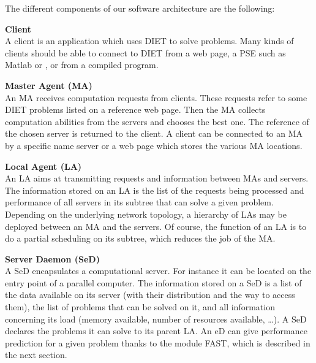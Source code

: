 The different components of our software architecture are the following:      

\begin{description}
\item \textbf{Client}\\
  A client is an application which uses DIET to solve problems.  Many kinds
  of clients should be able to connect to DIET from a web page, a PSE such as
  Matlab or \sci, or from a compiled program.
\item \textbf{Master Agent (MA)}\\
  An MA receives computation requests from clients. These requests refer to some
  DIET problems listed on a reference web page. Then the MA collects computation
  abilities from the servers and chooses the best one. The reference of the
  chosen server is returned to the client. A client can be connected to an MA by
  a specific name server or a web page which stores the various MA locations.

\item \textbf{Local Agent (LA)}\\
  An LA aims at transmitting requests and information between MAs and
  servers.  The information stored on an LA is the list of the
  requests being processed and performance of all servers in its
  subtree that can solve a given problem. Depending on the underlying
  network topology, a hierarchy of LAs may be deployed between an MA
  and the servers. Of course, the function of an LA is to do a partial
  scheduling on its subtree, which reduces the job of the MA.

\item \textbf{Server Daemon (SeD)}\\
  A SeD encapsulates a computational server. For instance it can be
  located on the entry point of a parallel computer. The information
  stored on a SeD is a list of the data available on its server (with
  their distribution and the way to access them), the list of problems
  that can be solved on it, and all information concerning its load
  (memory available, number of resources available, \ldots). A SeD
  declares the problems it can solve to its parent LA.  An eD can give
  performance prediction for a given problem thanks to the module
  FAST, which is described in the next section.

\end{description}

